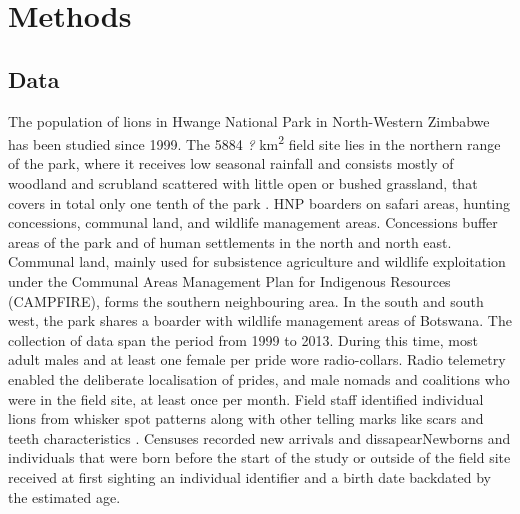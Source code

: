 %
\section*{Methods}

\subsection*{Data}
The population of lions in Hwange National Park in North-Western Zimbabwe has been studied since 1999. The 5884 \emph{?} km\textsuperscript{2} field site lies in the northern range of the park, where it receives low seasonal rainfall and consists mostly of woodland and scrubland scattered with little open or bushed grassland, that covers in total only one tenth of the park \citep{Loveridge:2007ic,Rogers:1993vs}. HNP boarders on safari areas, hunting concessions, communal land, and wildlife management areas. Concessions buffer areas of the park and of human settlements in the north and north east. Communal land, mainly used for subsistence agriculture and wildlife exploitation under the Communal Areas Management Plan for Indigenous Resources (CAMPFIRE), forms the southern neighbouring area. In the south and south west, the park shares a boarder with wildlife management areas of Botswana.   
The collection of data span the period from 1999 to 2013. During this time, most adult males and at least one female per pride wore radio-collars. Radio telemetry enabled the deliberate localisation of prides, and male nomads and coalitions who were in the field site, at least once per month. Field staff identified individual lions from whisker spot patterns along with other telling marks like scars and teeth characteristics \citep{Becker:2013ib}. Censuses recorded new arrivals and dissapearNewborns and individuals that were born before the start of the study or outside of the field site received at first sighting an individual identifier and a birth date backdated by the estimated age. 

